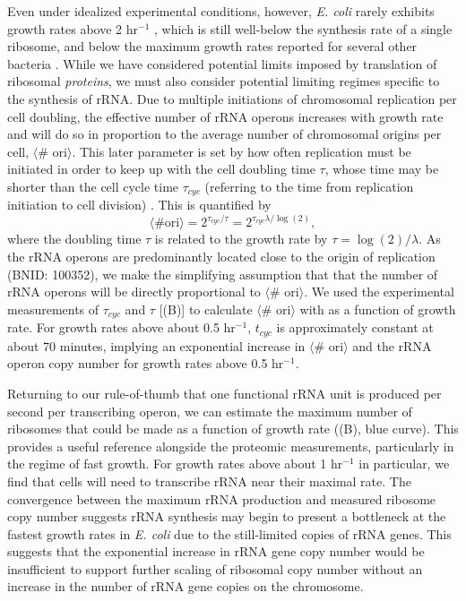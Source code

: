 Even under idealized experimental conditions, however, \textit{E. coli} rarely
exhibits growth rates above 2 hr$^{-1}$ \citep{bremer2008}, which is still
well-below the synthesis rate of a single ribosome, and below the maximum growth
rates reported for several other bacteria \citep{roller2016}. While we have
considered potential limits imposed by translation of ribosomal
\textit{proteins}, we must also consider potential limiting regimes specific to
the synthesis of rRNA. Due to multiple initiations of chromosomal replication
per cell doubling, the effective number of rRNA operons increases with growth
rate and will do so in proportion to the average number of chromosomal origins
per cell, $\langle$\# ori$\rangle$. This later parameter is set by how often
replication must be initiated in order to keep up with the cell doubling time
$\tau$, whose time may be shorter than the cell cycle time $\tau_{cyc}$
(referring to the time from replication initiation to cell division)
\citep{dennis2004, ho2015}. This is quantified by
\begin{equation}
    \langle \text{\# ori} \rangle = 2^{\tau_{cyc} / \tau} = 2^{\tau_{cyc} \lambda / \log(2)},
    \label{eq:Nori}
\end{equation}
where the doubling time $\tau$ is related to the growth rate by $\tau =
\log(2)/\lambda$. As the rRNA operons are predominantly located close to the
origin of replication (BNID: 100352), we make the simplifying assumption that
that the number of rRNA operons will be directly proportional to $\langle$\#
ori$\rangle$.  We used the experimental measurements of $\tau_{cyc}$ and $\tau$  [(B)] to
calculate $\langle$\# ori$\rangle$  with  as a function of growth
rate. For growth rates above about 0.5 hr$^{-1}$, $t_{cyc}$ is approximately
constant at about 70 minutes, implying an exponential increase in $\langle$\#
ori$\rangle$  and the rRNA operon copy number for growth rates above 0.5
hr$^{-1}$.

Returning to our rule-of-thumb that one functional rRNA unit is produced per
second per transcribing operon, we can estimate the maximum number of ribosomes
that could be made as a function of growth rate ((B), blue
curve). This provides a useful reference alongside the proteomic measurements,
particularly in the regime of fast growth. For growth rates above about 1
hr$^{-1}$ in particular, we find that cells will need to transcribe rRNA near
their maximal rate. The convergence between the maximum rRNA production and
measured ribosome copy number suggests rRNA synthesis may begin to present a
bottleneck at the fastest growth rates in \textit{E. coli} due to the
still-limited copies of rRNA genes. This suggests that the exponential increase
in rRNA gene copy number would be insufficient to support further scaling of
ribosomal copy number without an increase in the number of rRNA gene
copies on the chromosome.
